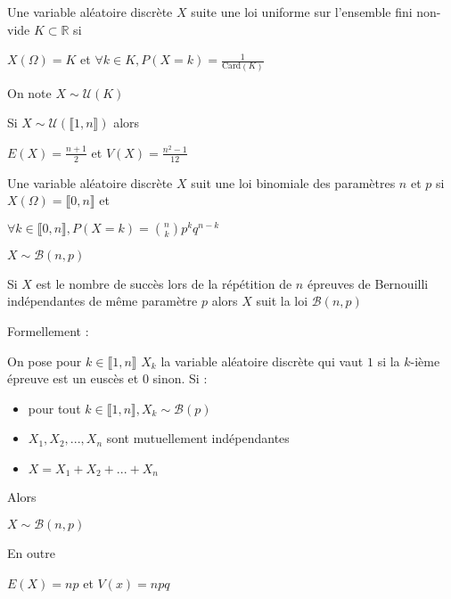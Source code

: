 \documentclass[a4paper,12pt]{book}
\newcommand{\Def}[2]{\begin{tcolorbox}[sharp corners, colback=white,colframe=blue!90!black!75, title=Définition : #1]#2\end{tcolorbox}}
\newcommand{\Prop}[2]{\begin{tcolorbox}[sharp corners, colback=white,colframe=red!90!black!75, title=Proposition : #1]#2\end{tcolorbox}}
\def\R{\mathbb{R}}
\begin{document}
\Def{}{Une variable aléatoire discrète $X$ suite une loi uniforme sur l'ensemble fini non-vide $K\subset \R$ si
\par\begin{center}$X(\Omega)=K$ et $\forall k\in K, P(X=k) = \frac{1}{\mathrm{Card}(K)}$\end{center}
On note $X\sim \mathcal{U}(K)$}
\Prop{}{Si $X\sim\mathcal{U}(\llbracket 1,n\rrbracket)$ alors
\par\begin{center}$E(X)=\frac{n+1}{2}$ et $V(X) = \frac{n^2-1}{12}$\end{center}}

\Def{}{Une variable aléatoire discrète $X$ suit une loi binomiale des paramètres $n$ et $p$ si $X(\Omega)=\llbracket 0,n\rrbracket$ et
\par\begin{center}$\forall k\in \llbracket 0,n\rrbracket, P(X=k)=\binom{n}{k}p^kq^{n-k}$\end{center}
\par $X\sim \mathcal{B}(n,p)$}
\Prop{Modèle loi binomiale}{Si $X$ est le nombre de succès lors de la répétition de $n$ épreuves de Bernouilli indépendantes de même paramètre $p$ alors $X$ suit la loi $\mathcal{B}(n,p)$
\par Formellement :
\par On pose pour $k\in\llbracket 1,n\rrbracket$ $X_k$ la variable aléatoire discrète qui vaut $1$ si la $k$-ième épreuve est un euscès et $0$ sinon. Si :\begin{itemize}
\item pour tout $k\in\llbracket 1,n\rrbracket, X_k\sim\mathcal{B}(p)$
\item $X_1,X_2,..., X_n$ sont mutuellement indépendantes
\item $X=X_1+X_2+...+X_n$
\end{itemize}
Alors \par\begin{center}$X\sim \mathcal{B}(n,p)$\end{center}
\par En outre \par\begin{center}$E(X)=np$ et $V(x)=npq$\end{center}}
\end{document}
